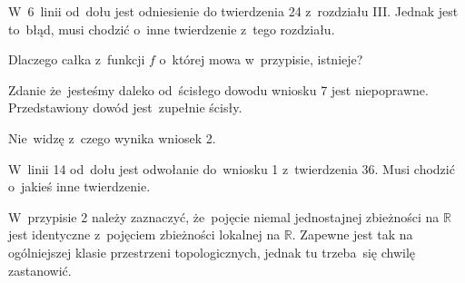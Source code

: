 \documentclass[a4paper,11pt]{article}
\begin{document}
\vspace{\spaceFour}


\start {} W~6~linii od~dołu jest odniesienie do twierdzenia 24
z~rozdziału III. Jednak jest to~błąd, musi chodzić o~inne twierdzenie
z~tego rozdziału.

\vspace{\spaceFour}


\start {} Dlaczego całka z~funkcji $f$ o~której mowa
w~przypisie, istnieje?

\vspace{\spaceFour}


\start {} Zdanie że~jesteśmy daleko od~ścisłego dowodu wniosku
7 jest niepoprawne. Przedstawiony dowód jest~zupełnie ścisły.

\vspace{\spaceFour}

  
\start {} Nie~widzę z~czego wynika wniosek 2.

\vspace{\spaceFour}


\start {} W~linii 14 od~dołu jest odwołanie do~wniosku 1
z~twierdzenia 36. Musi chodzić o~jakieś inne twierdzenie.

\vspace{\spaceFour}


\start {} W~przypisie 2 należy zaznaczyć, że~pojęcie niemal
jednostajnej zbieżności na $\mathbb{R}$ jest identyczne z~pojęciem
zbieżności lokalnej na $\mathbb{R}$. Zapewne jest tak na ogólniejszej
klasie przestrzeni topologicznych, jednak tu trzeba~się chwilę
zastanowić. %

\newpage
\end{document}
